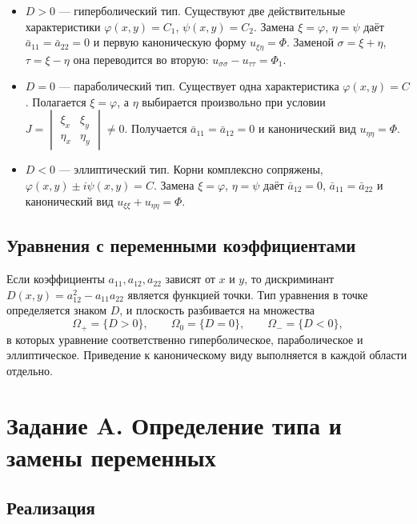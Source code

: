 \documentclass[a4paper,12pt]{article}
\begin{document}
\begin{itemize}
  \item $D>0$ --- гиперболический тип. Существуют две действительные характеристики
        $\varphi(x,y)=C_1$, $\psi(x,y)=C_2$. Замена $\xi=\varphi$, $\eta=\psi$ даёт
        $\bar a_{11}=\bar a_{22}=0$ и первую каноническую форму $u_{\xi\eta}=\Phi$.
        Заменой $\sigma=\xi+\eta$, $\tau=\xi-\eta$ она переводится во вторую:
        $u_{\sigma\sigma}-u_{\tau\tau}=\Phi_1$.
  \item $D=0$ --- параболический тип. Существует одна характеристика
        $\varphi(x,y)=C$. Полагается $\xi=\varphi$, а $\eta$ выбирается произвольно
        при условии
        $J=\begin{vmatrix}\xi_x&\xi_y\\ \eta_x&\eta_y\end{vmatrix}\neq0$.
        Получается $\bar a_{11}=\bar a_{12}=0$ и канонический вид
        $u_{\eta\eta}=\Phi$.
  \item $D<0$ --- эллиптический тип. Корни комплексно сопряжены,
        $\varphi(x,y)\pm i\psi(x,y)=C$. Замена $\xi=\varphi$, $\eta=\psi$ даёт
        $\bar a_{12}=0$, $\bar a_{11}=\bar a_{22}$ и канонический вид
        $u_{\xi\xi}+u_{\eta\eta}=\Phi$.
\end{itemize}

\subsection{Уравнения с переменными коэффициентами}

Если коэффициенты $a_{11},a_{12},a_{22}$ зависят от $x$ и $y$, то дискриминант
$D(x,y)=a_{12}^2-a_{11}a_{22}$ является функцией точки. Тип уравнения в точке
определяется знаком $D$, и плоскость разбивается на множества
\[
  \Omega_{+}=\{D>0\},\qquad \Omega_{0}=\{D=0\},\qquad \Omega_{-}=\{D<0\},
\]
в которых уравнение соответственно гиперболическое, параболическое и
эллиптическое. Приведение к каноническому виду выполняется в каждой области
отдельно.

\section{Задание A. Определение типа и замены переменных}

\subsection{Реализация}
\end{document}
